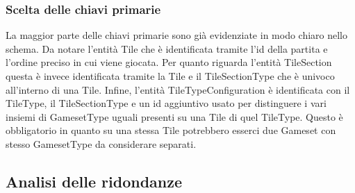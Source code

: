 \medskip
\subsubsection*{Scelta delle chiavi primarie}
La maggior parte delle chiavi primarie sono già evidenziate in modo chiaro nello schema. Da notare l'entità Tile che è identificata tramite l'id della partita e l'ordine preciso in cui viene giocata. Per quanto riguarda l'entità TileSection questa è invece identificata tramite la Tile e il TileSectionType che è univoco all'interno di una Tile. Infine, l'entità TileTypeConfiguration è identificata con il TileType, il TileSectionType e un id aggiuntivo usato per distinguere i vari insiemi di GamesetType uguali presenti su una Tile di quel TileType. Questo è obbligatorio in quanto su una stessa Tile potrebbero esserci due Gameset con stesso GamesetType da considerare separati.

\subsection{Analisi delle ridondanze}

